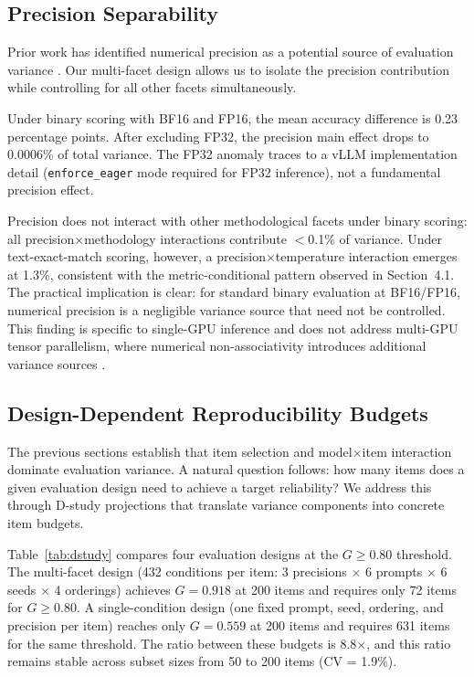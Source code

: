 \subsection{Precision Separability}

Prior work has identified numerical precision as a potential source of evaluation variance \cite{yuan2025layercast}. Our multi-facet design allows us to isolate the precision contribution while controlling for all other facets simultaneously.

Under binary scoring with BF16 and FP16, the mean accuracy difference is 0.23 percentage points. After excluding FP32, the precision main effect drops to 0.0006\% of total variance. The FP32 anomaly traces to a vLLM implementation detail (\texttt{enforce\_eager} mode required for FP32 inference), not a fundamental precision effect.

Precision does not interact with other methodological facets under binary scoring: all precision$\times$methodology interactions contribute $<$0.1\% of variance. Under text-exact-match scoring, however, a precision$\times$temperature interaction emerges at 1.3\%, consistent with the metric-conditional pattern observed in Section~4.1. The practical implication is clear: for standard binary evaluation at BF16/FP16, numerical precision is a negligible variance source that need not be controlled. This finding is specific to single-GPU inference and does not address multi-GPU tensor parallelism, where numerical non-associativity introduces additional variance sources \cite{shanmugavelu2024floating}.

\subsection{Design-Dependent Reproducibility Budgets}

The previous sections establish that item selection and model$\times$item interaction dominate evaluation variance. A natural question follows: how many items does a given evaluation design need to achieve a target reliability? We address this through D-study projections that translate variance components into concrete item budgets.

Table~\ref{tab:dstudy} compares four evaluation designs at the $G \geq 0.80$ threshold. The multi-facet design (432 conditions per item: 3 precisions $\times$ 6 prompts $\times$ 6 seeds $\times$ 4 orderings) achieves $G = 0.918$ at 200 items and requires only 72 items for $G \geq 0.80$. A single-condition design (one fixed prompt, seed, ordering, and precision per item) reaches only $G = 0.559$ at 200 items and requires 631 items for the same threshold. The ratio between these budgets is 8.8$\times$, and this ratio remains stable across subset sizes from 50 to 200 items (CV = 1.9\%).

